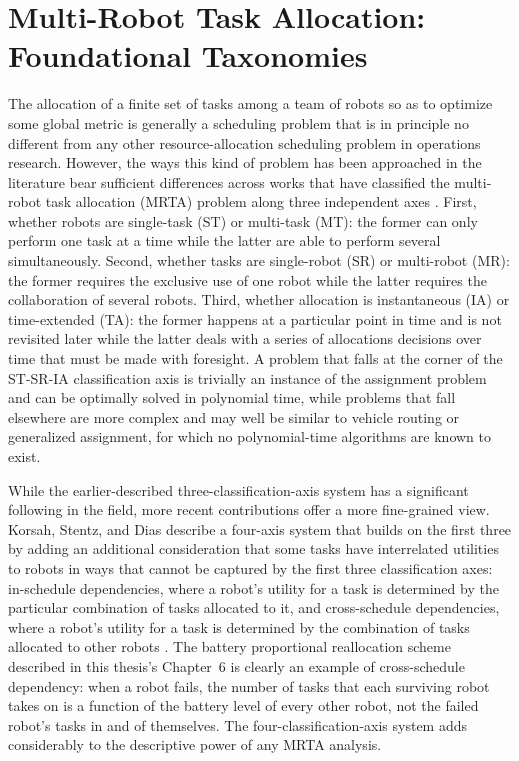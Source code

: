 \section{Multi-Robot Task Allocation: Foundational Taxonomies}

The allocation of a finite set of tasks among a team of robots so as to optimize some global metric is generally a scheduling problem that is in principle no different from any other resource-allocation scheduling problem in operations research. However, the ways this kind of problem has been approached in the literature bear sufficient differences across works that have classified the multi-robot task allocation (MRTA) problem along three independent axes \cite{gerkey2004formal}. First, whether robots are single-task (ST) or multi-task (MT): the former can only perform one task at a time while the latter are able to perform several simultaneously. Second, whether tasks are single-robot (SR) or multi-robot (MR): the former requires the exclusive use of one robot while the latter requires the collaboration of several robots. Third, whether allocation is instantaneous (IA) or time-extended (TA): the former happens at a particular point in time and is not revisited later while the latter deals with a series of allocations decisions over time that must be made with foresight. A problem that falls at the corner of the ST-SR-IA classification axis is trivially an instance of the assignment problem and can be optimally solved in polynomial time, while problems that fall elsewhere are more complex and may well be similar to vehicle routing or generalized assignment, for which no polynomial-time algorithms are known to exist.

While the earlier-described three-classification-axis system has a significant following in the field, more recent contributions offer a more fine-grained view. Korsah, Stentz, and Dias describe a four-axis system that builds on the first three by adding an additional consideration that some tasks have interrelated utilities to robots in ways that cannot be captured by the first three classification axes: in-schedule dependencies, where a robot's utility for a task is determined by the particular combination of tasks allocated to it, and cross-schedule dependencies, where a robot's utility for a task is determined by the combination of tasks allocated to other robots \cite{korsah2013comprehensive}. The battery proportional reallocation scheme described in this thesis's Chapter~6 is clearly an example of cross-schedule dependency: when a robot fails, the number of tasks that each surviving robot takes on is a function of the battery level of every other robot, not the failed robot's tasks in and of themselves. The four-classification-axis system adds considerably to the descriptive power of any MRTA analysis.

